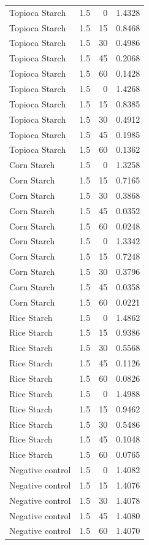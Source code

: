 \documentclass[
  12pt,
]{article}
\begin{document}
{\begin{longtable}[]{@{}lrrr@{}}
Topioca Starch & 1.5 & 0 & 1.4328 \\
Topioca Starch & 1.5 & 15 & 0.8468 \\
Topioca Starch & 1.5 & 30 & 0.4986 \\
Topioca Starch & 1.5 & 45 & 0.2068 \\
Topioca Starch & 1.5 & 60 & 0.1428 \\
Topioca Starch & 1.5 & 0 & 1.4268 \\
Topioca Starch & 1.5 & 15 & 0.8385 \\
Topioca Starch & 1.5 & 30 & 0.4912 \\
Topioca Starch & 1.5 & 45 & 0.1985 \\
Topioca Starch & 1.5 & 60 & 0.1362 \\
Corn Starch & 1.5 & 0 & 1.3258 \\
Corn Starch & 1.5 & 15 & 0.7165 \\
Corn Starch & 1.5 & 30 & 0.3868 \\
Corn Starch & 1.5 & 45 & 0.0352 \\
Corn Starch & 1.5 & 60 & 0.0248 \\
Corn Starch & 1.5 & 0 & 1.3342 \\
Corn Starch & 1.5 & 15 & 0.7248 \\
Corn Starch & 1.5 & 30 & 0.3796 \\
Corn Starch & 1.5 & 45 & 0.0358 \\
Corn Starch & 1.5 & 60 & 0.0221 \\
Rice Starch & 1.5 & 0 & 1.4862 \\
Rice Starch & 1.5 & 15 & 0.9386 \\
Rice Starch & 1.5 & 30 & 0.5568 \\
Rice Starch & 1.5 & 45 & 0.1126 \\
Rice Starch & 1.5 & 60 & 0.0826 \\
Rice Starch & 1.5 & 0 & 1.4988 \\
Rice Starch & 1.5 & 15 & 0.9462 \\
Rice Starch & 1.5 & 30 & 0.5486 \\
Rice Starch & 1.5 & 45 & 0.1048 \\
Rice Starch & 1.5 & 60 & 0.0765 \\
Negative control & 1.5 & 0 & 1.4082 \\
Negative control & 1.5 & 15 & 1.4076 \\
Negative control & 1.5 & 30 & 1.4078 \\
Negative control & 1.5 & 45 & 1.4080 \\
Negative control & 1.5 & 60 & 1.4070 \\

\end{longtable}}
\end{document}
